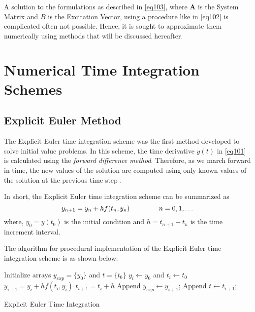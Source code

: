 A solution to the formulations as described in \cref{eq103}, where $
\mathbf{A}$ is the System Matrix and $B$ is the Excitation Vector, using a procedure like in \cref{eq102} is complicated often not possible. Hence, it is sought to approximate them numerically using methods that will be discussed hereafter.

\section{Numerical Time Integration Schemes}
\label{sec:timeintegration}
\subsection{Explicit Euler Method}
The Explicit Euler time integration scheme was the first method developed to solve initial value problems. In this scheme, the time derivative $\dot{y}(t)$ in \cref{eq101} is calculated using the \textit{forward difference method}. Therefore, as we march forward in time, the new values of the solution are computed using only known values of the solution at the previous time step \parencite[see][pg. 97]{Fuhrer2001}. 

In short, the Explicit Euler time integration scheme can be summarized as
\begin{equation}
\label{eq104}
y_{n+1} = y_n + h f(t_n, y_n) \text{\hspace{15mm}} n = 0,1,\ldots\\ \\
\end{equation}
where, $y_0 = y(t_0)$ is the initial condition and $h = t_{n+1} - t_n$ is the time increment interval.

The algorithm for procedural implementation of the Explicit Euler time integration scheme is as shown below:
\begin{center}
\smallskip
\begin{minipage}{.7\linewidth}
    \begin{algorithm}[H]
      \SetAlgoLined
      Initialize arrays $y_{exp}=\{y_0\}$ and $t=\{t_0\}$\;
      $y_{i} \gets y_0$ and $t_{i} \gets t_0$\;
        { 
      $y_{i+1} = y_{i} + h f(t_i, y_i)$\;
      $t_{i+1} = t_{i} + h$\;
      Append $y_{exp} \gets y_{i+1}$;
      Append $t \gets t_{i+1}$;
      }
     \caption{Explicit Euler Time Integration}
	\label{algo:exp_euler}
    \end{algorithm}
  \end{minipage}
\end{center}

